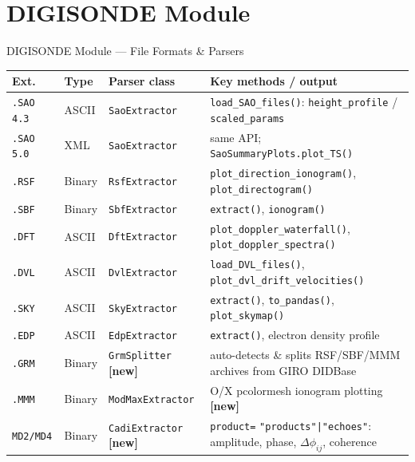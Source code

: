 \documentclass[aspectratio=169,11pt]{beamer}
\begin{document}
\section{DIGISONDE Module}

\begin{frame}{DIGISONDE Module — File Formats \& Parsers}
\vspace{-0.1cm}
\begin{center}
\scriptsize
\begin{tabular}{lll>{\raggedright\arraybackslash}p{5.0cm}}
  \toprule
  \textbf{Ext.} & \textbf{Type} & \textbf{Parser class} & \textbf{Key methods / output} \\
  \midrule
  \texttt{.SAO 4.3} & ASCII  & \texttt{SaoExtractor}  & \texttt{load\_SAO\_files()}: \texttt{height\_profile} / \texttt{scaled\_params} \\
  \texttt{.SAO 5.0} & XML    & \texttt{SaoExtractor}  & same API; \texttt{SaoSummaryPlots.plot\_TS()} \\
  \texttt{.RSF}     & Binary & \texttt{RsfExtractor}  & \texttt{plot\_direction\_ionogram()}, \texttt{plot\_directogram()} \\
  \texttt{.SBF}     & Binary & \texttt{SbfExtractor}  & \texttt{extract()}, \texttt{ionogram()} \\
  \texttt{.DFT}     & ASCII  & \texttt{DftExtractor}  & \texttt{plot\_doppler\_waterfall()}, \texttt{plot\_doppler\_spectra()} \\
  \texttt{.DVL}     & ASCII  & \texttt{DvlExtractor}  & \texttt{load\_DVL\_files()}, \texttt{plot\_dvl\_drift\_velocities()} \\
  \texttt{.SKY}     & ASCII  & \texttt{SkyExtractor}  & \texttt{extract()}, \texttt{to\_pandas()}, \texttt{plot\_skymap()} \\
  \texttt{.EDP}     & ASCII  & \texttt{EdpExtractor}  & \texttt{extract()}, electron density profile \\
  \texttt{.GRM}     & Binary & \texttt{GrmSplitter} \textbf{[new]} & auto-detects \& splits RSF/SBF/MMM archives from GIRO DIDBase \\
  \texttt{.MMM}     & Binary & \texttt{ModMaxExtractor} & O/X pcolormesh ionogram plotting \textbf{[new]} \\
  \texttt{MD2/MD4}  & Binary & \texttt{CadiExtractor} \textbf{[new]} & \texttt{product=} \texttt{"products"|"echoes"}: amplitude, phase, $\Delta\phi_{ij}$, coherence \\

\end{tabular}
\end{center}
\end{frame}
\end{document}
